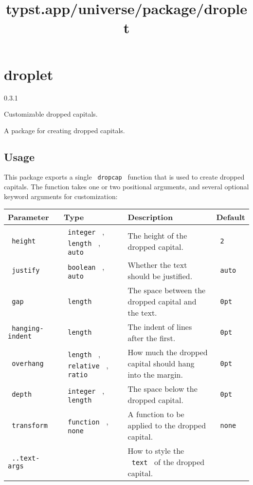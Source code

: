 \title{typst.app/universe/package/droplet}

\label{banner}
\section{droplet}\label{droplet}

{ 0.3.1 }

Customizable dropped capitals.

\label{readme}
A package for creating dropped capitals.

\subsection{Usage}\label{usage}

This package exports a single \texttt{\ dropcap\ } function that is used
to create dropped capitals. The function takes one or two positional
arguments, and several optional keyword arguments for customization:

\begin{longtable}[]{@{}llll@{}}
\toprule\noalign{}
Parameter & Type & Description & Default \\
\midrule\noalign{}
\endhead
\bottomrule\noalign{}
\endlastfoot
\texttt{\ height\ } & \texttt{\ integer\ } , \texttt{\ length\ } ,
\texttt{\ auto\ } & The height of the dropped capital. &
\texttt{\ 2\ } \\
\texttt{\ justify\ } & \texttt{\ boolean\ } , \texttt{\ auto\ } &
Whether the text should be justified. & \texttt{\ auto\ } \\
\texttt{\ gap\ } & \texttt{\ length\ } & The space between the dropped
capital and the text. & \texttt{\ 0pt\ } \\
\texttt{\ hanging-indent\ } & \texttt{\ length\ } & The indent of lines
after the first. & \texttt{\ 0pt\ } \\
\texttt{\ overhang\ } & \texttt{\ length\ } , \texttt{\ relative\ } ,
\texttt{\ ratio\ } & How much the dropped capital should hang into the
margin. & \texttt{\ 0pt\ } \\
\texttt{\ depth\ } & \texttt{\ integer\ } , \texttt{\ length\ } & The
space below the dropped capital. & \texttt{\ 0pt\ } \\
\texttt{\ transform\ } & \texttt{\ function\ } , \texttt{\ none\ } & A
function to be applied to the dropped capital. & \texttt{\ none\ } \\
\texttt{\ ..text-args\ } & & How to style the \texttt{\ text\ } of the
dropped capital. & \\
\end{longtable}

